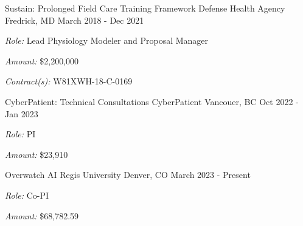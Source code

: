 \begin{cventries}
  \cventry
    {Sustain: Prolonged Field Care Training Framework} %
    {Defense Health Agency} %
    {Fredrick, MD} %
    {March 2018 - Dec 2021} %
     {
     \begin{cvitems}
     \item{\textit{Role:} Lead Physiology Modeler and Proposal Manager}
     \item{\textit{Amount:} \$2,200,000}
     \item{\textit{Contract(s):} W81XWH-18-C-0169}
     \end{cvitems}
     }

  \cventry
    {CyberPatient: Technical Consultations} %
    {CyberPatient} %
    {Vancouer, BC} %
    {Oct 2022 - Jan 2023} %
     {
     \begin{cvitems}
     \item{\textit{Role:} PI}
     \item{\textit{Amount:} \$23,910}
     \end{cvitems}
     }

  \cventry
    {Overwatch AI} %
    {Regis University} %
    {Denver, CO} %
    {March 2023 - Present} %
     {
     \begin{cvitems}
     \item{\textit{Role:} Co-PI}
     \item{\textit{Amount:} \$68,782.59}
     \end{cvitems}
     }



\end{cventries}
